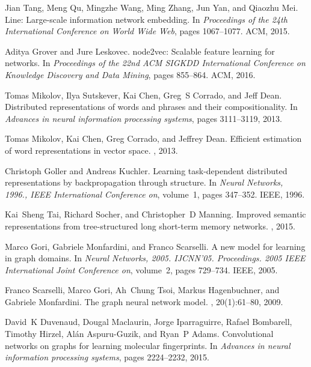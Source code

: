 \documentclass{article}
\begin{document}
\begin{thebibliography}{10}
Jian Tang, Meng Qu, Mingzhe Wang, Ming Zhang, Jun Yan, and Qiaozhu Mei.
\newblock Line: Large-scale information network embedding.
\newblock In {\em Proceedings of the 24th International Conference on World
  Wide Web}, pages 1067--1077. ACM, 2015.

Aditya Grover and Jure Leskovec.
\newblock node2vec: Scalable feature learning for networks.
\newblock In {\em Proceedings of the 22nd ACM SIGKDD International Conference
  on Knowledge Discovery and Data Mining}, pages 855--864. ACM, 2016.

Tomas Mikolov, Ilya Sutskever, Kai Chen, Greg~S Corrado, and Jeff Dean.
\newblock Distributed representations of words and phrases and their
  compositionality.
\newblock In {\em Advances in neural information processing systems}, pages
  3111--3119, 2013.

Tomas Mikolov, Kai Chen, Greg Corrado, and Jeffrey Dean.
\newblock Efficient estimation of word representations in vector space.
, 2013.

Christoph Goller and Andreas Kuchler.
\newblock Learning task-dependent distributed representations by
  backpropagation through structure.
\newblock In {\em Neural Networks, 1996., IEEE International Conference on},
  volume~1, pages 347--352. IEEE, 1996.

Kai~Sheng Tai, Richard Socher, and Christopher~D Manning.
\newblock Improved semantic representations from tree-structured long
  short-term memory networks.
, 2015.

Marco Gori, Gabriele Monfardini, and Franco Scarselli.
\newblock A new model for learning in graph domains.
\newblock In {\em Neural Networks, 2005. IJCNN'05. Proceedings. 2005 IEEE
  International Joint Conference on}, volume~2, pages 729--734. IEEE, 2005.

Franco Scarselli, Marco Gori, Ah~Chung Tsoi, Markus Hagenbuchner, and Gabriele
  Monfardini.
\newblock The graph neural network model.
, 20(1):61--80, 2009.

David~K Duvenaud, Dougal Maclaurin, Jorge Iparraguirre, Rafael Bombarell,
  Timothy Hirzel, Al{\'a}n Aspuru-Guzik, and Ryan~P Adams.
\newblock Convolutional networks on graphs for learning molecular fingerprints.
\newblock In {\em Advances in neural information processing systems}, pages
  2224--2232, 2015.


\end{thebibliography}
\end{document}
